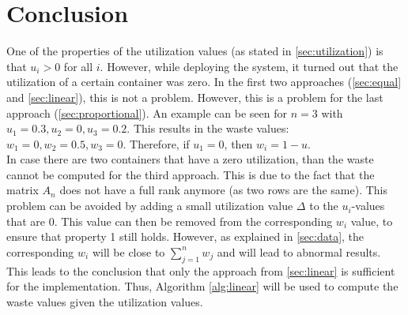 \section{Conclusion} \label{sec:conclusion4}
One of the properties of the utilization values (as stated in \autoref{sec:utilization}) is that $u_i > 0$ for all $i$. However, while deploying the system, it turned out that the utilization of a certain container was zero. In the first two approaches (\autoref{sec:equal} and \autoref{sec:linear}), this is not a problem. However, this is a problem for the last approach (\autoref{sec:proportional}). An example can be seen for $n = 3$ with $u_1 = 0.3, u_2 = 0, u_3 = 0.2$. This results in the waste values: $w_1 = 0, w_2 = 0.5, w_3 = 0$. Therefore, if $u_1 = 0$, then $w_i = 1 - u$.\\

\noindent
In case there are two containers that have a zero utilization, than the waste cannot be computed for the third approach. This is due to the fact that the matrix $A_n$ does not have a full rank anymore (as two rows are the same). This problem can be avoided by adding a small utilization value $\Delta$ to the $u_i$-values that are $0$. This value can then be removed from the corresponding $w_i$ value, to ensure that property 1 still holds. However, as explained in \autoref{sec:data}, the corresponding $w_i$ will be close to $\sum_{j=1}^n w_j$ and will lead to abnormal results. This leads to the conclusion that only the approach from \autoref{sec:linear} is sufficient for the implementation. Thus, Algorithm \ref{alg:linear} will be used to compute the waste values given the utilization values.
